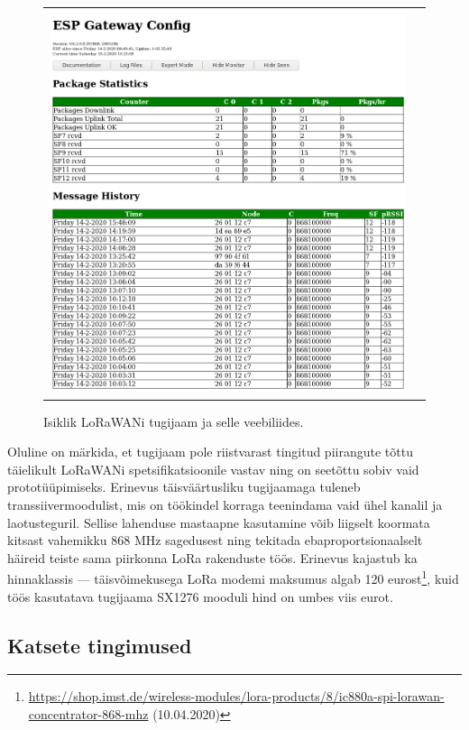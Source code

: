 \documentclass[12pt]{article}
\begin{document}
\begin{figure} [htbp]
\begin{tabular}{c c}
\begin{minipage}{0.53\textwidth}
                \includegraphics[width=\textwidth]{figures/ttn-jaama-liides.png}
            \end{minipage}
        \end{tabular}
        \caption{Isiklik LoRaWANi tugijaam ja selle veebiliides.}
        \label{fig:omatugijaam}
    \end{figure}

    Oluline on märkida, et tugijaam pole riistvarast tingitud piirangute tõttu täielikult LoRaWANi spetsifikatsioonile vastav ning on seetõttu sobiv vaid prototüüpimiseks.
    Erinevus täisväärtusliku tugijaamaga tuleneb transsiivermoodulist, mis on töökindel korraga teenindama vaid ühel kanalil ja laotusteguril.
    Sellise lahenduse mastaapne kasutamine võib liigselt koormata kitsast vahemikku 868 MHz sagedusest ning tekitada ebaproportsionaalselt häireid teiste sama piirkonna LoRa rakenduste töös.
    Erinevus kajastub ka hinnaklassis — täisvõimekusega LoRa modemi maksumus algab 120 eurost\footnote{\url{https://shop.imst.de/wireless-modules/lora-products/8/ic880a-spi-lorawan-concentrator-868-mhz} (10.04.2020)}, kuid töös kasutatava tugijaama SX1276 mooduli hind on umbes viis eurot.

    \subsection{Katsete tingimused}
\end{document}
